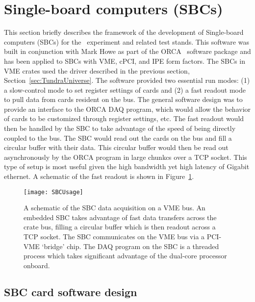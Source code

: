 	\section{Single-board computers (SBCs)}

    This section briefly describes the framework of the development of Single-board computers (SBCs) for the \MJ~experiment
and related test stands.  This software was built in conjunction with Mark Howe as part of the ORCA~\cite{Howe08} software package and has been
applied to SBCs with VME, cPCI, and IPE form factors.  The SBCs in VME crates used the driver described in the previous
section, Section~\ref{sec:TundraUniverse}.  The software provided two essential run modes: (1) a slow-control mode to
set register settings of cards and (2) a fast readout mode to pull data from cards resident on the bus. The general software
design was to provide an interface to the ORCA DAQ program, which would allow the behavior of cards to be customized through
register settings, etc.  The fast readout would then be handled by the SBC to take advantage of the speed of being directly coupled to the bus.  The SBC would read out the cards on the bus and fill a circular buffer with their data.  This circular
buffer would then be read out asynchronously by the ORCA program in large chunkcs over a TCP socket.  This type of setup is most useful given the high bandwidth yet high latency of Gigabit ethernet.  A schematic of the fast readout is shown in Figure~\ref{fig:SBCReadout}. 

		\begin{figure}
			\centering
			\texttt{[image: SBCUsage]}
			\caption[A schematic of the SBC data acquisition on a VME bus]
					{A schematic of the SBC data acquisition on a VME bus.  An embedded SBC takes
			         advantage of fast data transfers across the crate bus, filling
			         a circular buffer which is then readout across a TCP socket.
			         The SBC communicates on the VME bus via a PCI-VME `bridge' chip.  
			         The DAQ program on the SBC is a threaded process which takes
			         significant advantage of the dual-core processor onboard.} 
			\label{fig:SBCReadout}
		\end{figure}

		\subsection{SBC card software design}	

